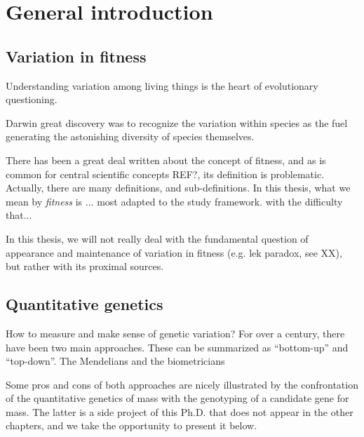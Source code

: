 
\chapter[Chapter 1: General introduction]{General introduction}

\section{Variation in fitness}
Understanding variation among living things is the heart of evolutionary questioning.


Darwin great discovery was to recognize the variation within species as the fuel generating the astonishing diversity of species themselves.

There has been a great deal written about the concept of fitness, and as is common for central scientific concepts REF?, its definition is problematic. Actually, there are many definitions, and sub-definitions. 
In this thesis, what we mean by \emph{fitness} is ...
most adapted to the study framework.
with the difficulty that... 


In this thesis, we will not really deal with the fundamental question of appearance and maintenance of variation in fitness (e.g. lek paradox, see XX), but rather with its proximal sources.

 
\section{Quantitative genetics}

How to measure and make sense of genetic variation?
For over a century, there have been two main approaches. 
These can be summarized as ``bottom-up'' and ``top-down''.
The Mendelians and the biometricians

Some pros and cons of both approaches are nicely illustrated by the confrontation of the quantitative genetics of mass with the genotyping of a candidate gene for mass. The latter is a side project of this Ph.D. that does not appear in the other chapters, and we take the opportunity to present it below.


